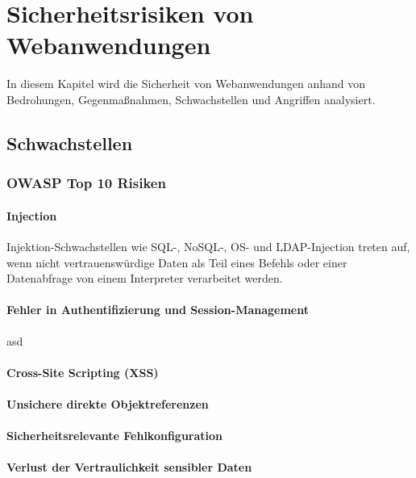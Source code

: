 \chapter{Sicherheitsrisiken von Webanwendungen}
\label{chap:k3}

In diesem Kapitel wird die Sicherheit von Webanwendungen anhand von Bedrohungen, Gegenmaßnahmen, Schwachstellen und Angriffen analysiert.

\section{Schwachstellen}

\subsection{OWASP Top 10 Risiken}

\subsubsection{Injection}

Injektion-Schwachstellen wie SQL-, NoSQL-, OS- und LDAP-Injection treten auf, wenn nicht vertrauenswürdige Daten als Teil eines Befehls oder einer Datenabfrage von einem Interpreter verarbeitet werden\cite[6]{owasp17top10}.

\subsubsection{Fehler in Authentifizierung und Session-Management}

asd

\subsubsection{Cross-Site Scripting (XSS)}

\subsubsection{Unsichere direkte Objektreferenzen}

\subsubsection{Sicherheitsrelevante Fehlkonfiguration}

\subsubsection{Verlust der Vertraulichkeit sensibler Daten}


